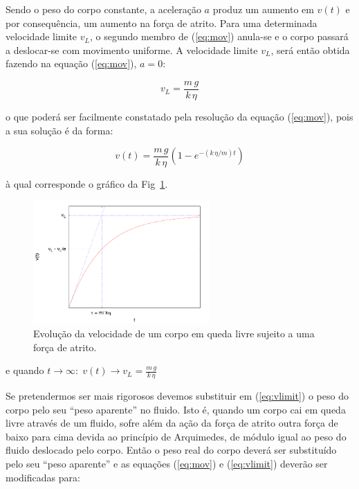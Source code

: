 \documentclass[a4paper,twoside,12pt]{article}      %
\begin{document}
Sendo o peso do corpo constante, a aceleração $a$ produz um aumento  em $v(t)$ e por consequência, um aumento na força de atrito. Para uma determinada velocidade limite $v_L$, o segundo membro de (\ref{eq:mov}) anula-se e o corpo passará a deslocar-se com movimento uniforme. A velocidade limite $v_L$, será então obtida fazendo na equação (\ref{eq:mov}), $a= 0$:

\begin{equation}
	\label{eq:vlimit}
	v_L = \frac{m\,g}{k  \, \eta}
\end{equation}

o que poderá ser facilmente constatado pela resolução da equação (\ref{eq:mov}), pois a sua solução é da forma:

\begin{equation}
	\label{eq:vlimita}
	v(t) = \frac{m\,g}{k  \, \eta} (1 - e^{- (k\,\eta / m) t})
\end{equation}

à qual corresponde o gráfico  da Fig~\ref{fig:vLim}.


\begin{figure}	[tb]
  \centering 
	\includegraphics[width=0.6\textwidth]{./plote}
	\caption{ Evolução da velocidade de um corpo em queda livre sujeito a uma força de atrito. \label{fig:vLim}} 
\end{figure}


e quando $t \to \infty :\; v(t) \to v_L = \frac{m\,g}{k  \, \eta} $

Se pretendermos ser mais rigorosos devemos substituir  em (\ref{eq:vlimit}) o peso do corpo pelo seu “peso aparente” no fluido. Isto é, quando um corpo cai em queda livre através de um fluido, sofre além da ação da força de atrito outra força de baixo para cima devida ao princípio de Arquimedes, de módulo igual ao peso do fluido deslocado pelo corpo. Então o peso real do corpo deverá ser substituído pelo seu “peso aparente”  e as equações (\ref{eq:mov}) e (\ref{eq:vlimit}) deverão ser modificadas para:
\end{document}
